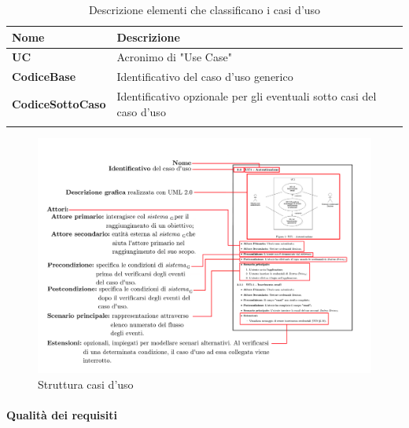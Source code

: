 \setlength{\freewidth}{\dimexpr\textwidth-0\tabcolsep}
	\renewcommand{\arraystretch}{1.5}
	\setlength{\aboverulesep}{0pt}
	\setlength{\belowrulesep}{0pt}
	\begin{longtable}{L{.2\freewidth} L{.6\freewidth} L{.080\freewidth}}
		\textbf{Nome} & \textbf{Descrizione} \\
		\toprule
		\endhead		
		\textbf{UC} & Acronimo di "Use Case" \\
		\textbf{CodiceBase} & Identificativo del caso d'uso generico \\
		\textbf{CodiceSottoCaso} & Identificativo opzionale per gli eventuali sotto casi del caso d'uso \\
		\bottomrule
		\hiderowcolors
		\caption{Descrizione elementi che classificano i casi d'uso}
	\end{longtable}


\begin{figure}[H]
    \centering
    \includegraphics[scale = 0.6]{components/immagini/casouso.png}
    \caption{Struttura casi d'uso}
\end{figure}


\paragraph*{Qualità dei requisiti} 

